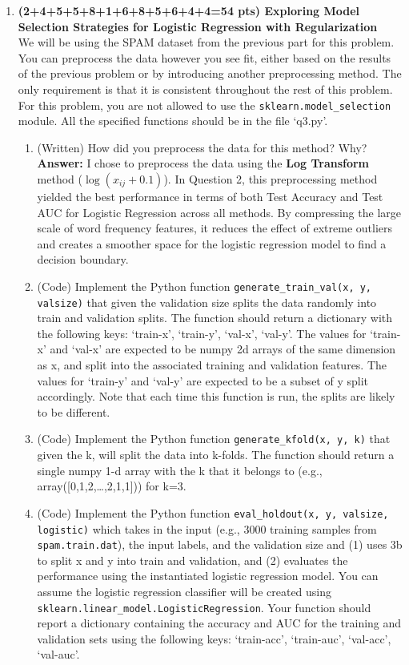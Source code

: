 \documentclass[a4paper,12pt]{article}
\begin{document}
\begin{enumerate}
    \vspace{1em}
    \item \textbf{(2+4+5+5+8+1+6+8+5+6+4+4=54 pts) Exploring Model Selection Strategies for Logistic Regression with Regularization} \\
    We will be using the SPAM dataset from the previous part for this problem. You can preprocess the data however you see fit, either based on the results of the previous problem or by introducing another preprocessing method. The only requirement is that it is consistent throughout the rest of this problem. For this problem, you are not allowed to use the \texttt{sklearn.model\_selection} module. All the specified functions should be in the file `q3.py'.
    
    \begin{enumerate}
        \item[(a)] (Written) How did you preprocess the data for this method? Why? \\
        \textbf{Answer:} I chose to preprocess the data using the \textbf{Log Transform} method ($\log(x_{ij} + 0.1)$). In Question 2, this preprocessing method yielded the best performance in terms of both Test Accuracy and Test AUC for Logistic Regression across all methods. By compressing the large scale of word frequency features, it reduces the effect of extreme outliers and creates a smoother space for the logistic regression model to find a decision boundary.
        \item[(b)] (Code) Implement the Python function \texttt{generate\_train\_val(x, y, valsize)} that given the validation size splits the data randomly into train and validation splits. The function should return a dictionary with the following keys: `train-x', `train-y', `val-x', `val-y'. The values for `train-x' and `val-x' are expected to be numpy 2d arrays of the same dimension as x, and split into the associated training and validation features. The values for `train-y' and `val-y' are expected to be a subset of y split accordingly. Note that each time this function is run, the splits are likely to be different.
        \item[(c)] (Code) Implement the Python function \texttt{generate\_kfold(x, y, k)} that given the k, will split the data into k-folds. The function should return a single numpy 1-d array with the k that it belongs to (e.g., array([0,1,2,\dots,2,1,1])) for k=3.
        \item[(d)] (Code) Implement the Python function \texttt{eval\_holdout(x, y, valsize, logistic)} which takes in the input (e.g., 3000 training samples from \texttt{spam.train.dat}), the input labels, and the validation size and (1) uses 3b to split x and y into train and validation, and (2) evaluates the performance using the instantiated logistic regression model. You can assume the logistic regression classifier will be created using \texttt{sklearn.linear\_model.LogisticRegression}. Your function should report a dictionary containing the accuracy and AUC for the training and validation sets using the following keys: `train-acc', `train-auc', `val-acc', `val-auc'.

\end{enumerate}
\end{enumerate}
\end{document}
